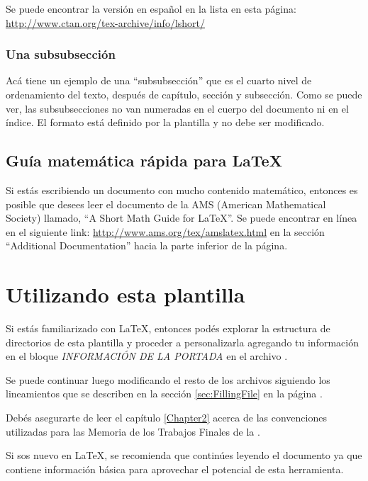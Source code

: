 Se puede encontrar la versión en español en la lista en esta página: \url{http://www.ctan.org/tex-archive/info/lshort/}

\subsubsection{Una subsubsección}

Acá tiene un ejemplo de una ``subsubsección'' que es el cuarto nivel de ordenamiento del texto, después de capítulo, sección y subsección.  Como se puede ver, las subsubsecciones no van numeradas en el cuerpo del documento ni en el índice.  El formato está definido por la plantilla y no debe ser modificado.

\subsection{Guía matemática rápida para \LaTeX{}}

Si estás escribiendo un documento con mucho contenido matemático, entonces es posible que desees leer el documento de la AMS (American Mathematical Society) llamado, \enquote{A Short Math Guide for \LaTeX{}}. Se puede encontrar en línea en el siguiente link: \url{http://www.ams.org/tex/amslatex.html} en la sección \enquote{Additional Documentation} hacia la parte inferior de la página.



\section{Utilizando esta plantilla}

Si estás familiarizado con \LaTeX{}, entonces podés explorar la estructura de directorios de esta plantilla y proceder a personalizarla agregando tu información en el bloque \emph{INFORMACIÓN DE LA PORTADA} en el archivo .  

Se puede continuar luego modificando el resto de los archivos siguiendo los lineamientos que se describen en la sección \ref{sec:FillingFile} en la página \pageref{sec:FillingFile}.

Debés asegurarte de leer el capítulo \ref{Chapter2} acerca de las convenciones utilizadas para las Memoria de los Trabajos Finales de la \degreename.

Si sos nuevo en \LaTeX{}, se recomienda que continúes leyendo el documento ya que contiene información básica para aprovechar el potencial de esta herramienta.


